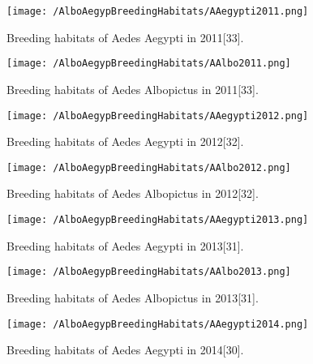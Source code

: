 \documentclass[11pt]{exam}
\begin{document}
\begin{questions}
\begin{enumerate}
\newpage
\begin{figure}[H]
  \centering
   \texttt{[image: /AlboAegypBreedingHabitats/AAegypti2011.png]} 
  \caption{Breeding habitats of Aedes Aegypti in 2011[33].}
   \label{Breeding habitats of Aedes mosquitoes}
\end{figure} 

\begin{figure}[H]
  \centering
   \texttt{[image: /AlboAegypBreedingHabitats/AAlbo2011.png]} 
  \caption{Breeding habitats of Aedes Albopictus in 2011[33].}
   \label{Breeding habitats of Aedes mosquitoes}
\end{figure} 

\newpage
\begin{figure}[H]
  \centering
   \texttt{[image: /AlboAegypBreedingHabitats/AAegypti2012.png]} 
  \caption{Breeding habitats of Aedes Aegypti in 2012[32].}
   \label{Breeding habitats of Aedes mosquitoes}
\end{figure} 

\begin{figure}[H]
  \centering
   \texttt{[image: /AlboAegypBreedingHabitats/AAlbo2012.png]} 
  \caption{Breeding habitats of Aedes Albopictus in 2012[32].}
   \label{Breeding habitats of Aedes mosquitoes}
\end{figure} 

\newpage
\begin{figure}[H]
  \centering
   \texttt{[image: /AlboAegypBreedingHabitats/AAegypti2013.png]} 
  \caption{Breeding habitats of Aedes Aegypti in 2013[31].}
   \label{Breeding habitats of Aedes mosquitoes}
\end{figure} 

\begin{figure}[H]
  \centering
   \texttt{[image: /AlboAegypBreedingHabitats/AAlbo2013.png]} 
  \caption{Breeding habitats of Aedes Albopictus in 2013[31].}
   \label{Breeding habitats of Aedes mosquitoes}
\end{figure} 

\newpage
\begin{figure}[H]
  \centering
   \texttt{[image: /AlboAegypBreedingHabitats/AAegypti2014.png]} 
  \caption{Breeding habitats of Aedes Aegypti in 2014[30].}
   \label{Breeding habitats of Aedes mosquitoes}
\end{figure} 


\end{enumerate}
\end{questions}
\end{document}
